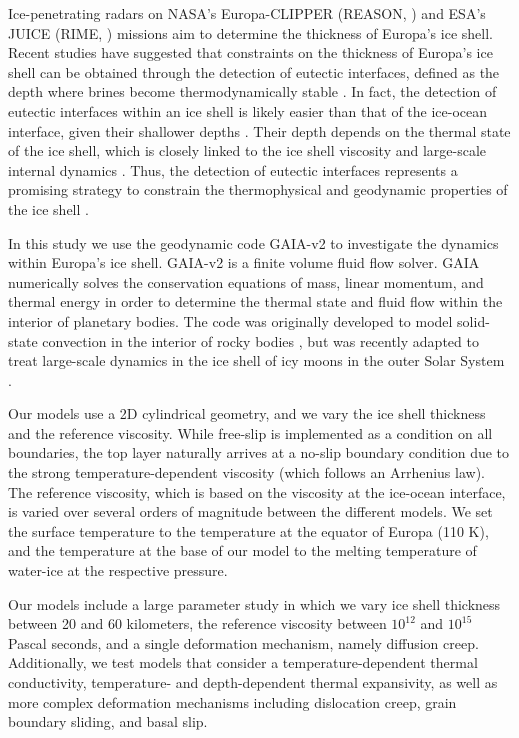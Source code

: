 \documentclass[11pt]{article}
\begin{document}
Ice-penetrating radars on NASA’s Europa-CLIPPER (REASON, \cite{4}) and ESA’s JUICE (RIME, \cite{5})
missions aim to determine the thickness of Europa's ice shell. Recent studies have suggested that
constraints on the thickness of Europa’s ice shell can be obtained through the detection of eutectic
interfaces, defined as the depth where brines become thermodynamically stable \cite{6}.
In fact, the detection of eutectic interfaces within an ice shell is likely easier than that of the ice-ocean interface, given their shallower depths \cite{7,8,9}. 
Their depth depends on the thermal state of the ice shell, which is closely linked to the ice shell viscosity and large-scale internal dynamics \cite{7}. Thus, the detection of eutectic interfaces represents a promising strategy to constrain the thermophysical and geodynamic properties of the ice shell \cite{6,7}. 

In this study we use the geodynamic code GAIA-v2 \cite{1} to investigate the dynamics within Europa's ice shell. GAIA-v2 is a finite volume fluid flow solver. GAIA numerically solves the conservation equations of mass, linear momentum, and thermal energy in order to determine the thermal state and fluid flow within the interior of planetary bodies. The code was originally developed to model solid-state convection in the interior of rocky bodies \cite{10,11,12}, but was recently adapted to treat large-scale dynamics in the ice shell of icy moons in the outer Solar System \cite{13}.

Our models use a 2D cylindrical geometry, and we vary the ice shell thickness and the reference viscosity. 
While free-slip is implemented as a condition on all boundaries, the top layer naturally arrives at a 
no-slip boundary condition due to the strong temperature-dependent viscosity (which follows an Arrhenius law). 
The reference viscosity, which is based on the viscosity at the ice-ocean interface, is varied over several orders of magnitude between the different models. We set the surface temperature to the temperature at the equator of Europa (110 K), and the temperature at the base of our model to the melting temperature of water-ice at the respective pressure. 

Our models include a large parameter study in which we vary ice shell thickness between 20 and 60 kilometers, the reference viscosity between $10^{12}$ and $10^{15}$ Pascal seconds, and a single deformation mechanism, namely diffusion creep. Additionally, we test models that consider a temperature-dependent thermal conductivity, temperature-  and depth-dependent thermal expansivity, as well as more complex deformation mechanisms including dislocation creep, grain boundary sliding, and basal slip. 
\end{document}
